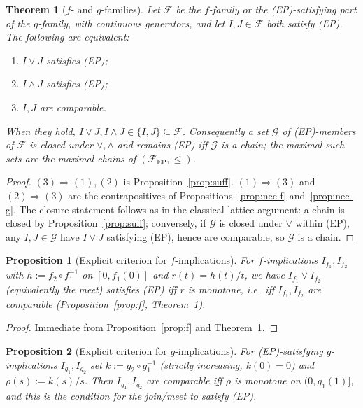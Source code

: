 \documentclass{amsart}
\theoremstyle{plain}
\newtheorem{theorem}{Theorem}
\newtheorem{proposition}{Proposition}
\theoremstyle{definition}
\newcommand{\Fcal}{\mathcal{F}}
\begin{document}
\begin{theorem}[$f$- and $g$-families]\label{thm:fg}
Let $\Fcal$ be the $f$-family or the \textup{(EP)}-satisfying part of the $g$-family, with
continuous generators, and let $I,J\in\Fcal$ both satisfy \textup{(EP)}.  The following are
equivalent:
\begin{enumerate}
\item $I\vee J$ satisfies \textup{(EP)};
\item $I\wedge J$ satisfies \textup{(EP)};
\item $I,J$ are comparable.
\end{enumerate}
When they hold, $I\vee J,I\wedge J\in\{I,J\}\subseteq\Fcal$.  Consequently a set
$\mathcal G$ of \textup{(EP)}-members of $\Fcal$ is closed under $\vee,\wedge$ and remains
\textup{(EP)} iff $\mathcal G$ is a \emph{chain}; the maximal such sets are the maximal
chains of $(\Fcal_{\mathrm{EP}},\le)$.
\end{theorem}

\begin{proof}
$(3)\Rightarrow(1),(2)$ is Proposition~\ref{prop:suff}.  $(1)\Rightarrow(3)$ and
$(2)\Rightarrow(3)$ are the contrapositives of Propositions~\ref{prop:nec-f}
and~\ref{prop:nec-g}.  The closure statement follows as in the classical lattice argument:
a chain is closed by Proposition~\ref{prop:suff}; conversely, if $\mathcal G$ is closed under
$\vee$ within (EP), any $I,J\in\mathcal G$ have $I\vee J$ satisfying (EP), hence are
comparable, so $\mathcal G$ is a chain.
\end{proof}

\begin{proposition}[Explicit criterion for $f$-implications]\label{prop:fexp}
For $f$-implications $I_{f_1},I_{f_2}$ with $h:=f_2\circ f_1^{-1}$ on $[0,f_1(0)]$ and
$r(t)=h(t)/t$, we have $I_{f_1}\vee I_{f_2}$ (equivalently the meet) satisfies
\textup{(EP)} iff $r$ is monotone, i.e.\ iff $I_{f_1},I_{f_2}$ are comparable
(Proposition~\ref{prop:f}, Theorem~\ref{thm:fg}).
\end{proposition}

\begin{proof}
Immediate from Proposition~\ref{prop:f} and Theorem~\ref{thm:fg}.
\end{proof}

\begin{proposition}[Explicit criterion for $g$-implications]\label{prop:g}
For \textup{(EP)}-satisfying $g$-implications $I_{g_1},I_{g_2}$ set $k:=g_2\circ g_1^{-1}$
(strictly increasing, $k(0)=0$) and $\rho(s):=k(s)/s$.  Then $I_{g_1},I_{g_2}$ are comparable
iff $\rho$ is monotone on $(0,g_1(1)]$, and this is the condition for the join/meet to
satisfy \textup{(EP)}.
\end{proposition}
\end{document}
